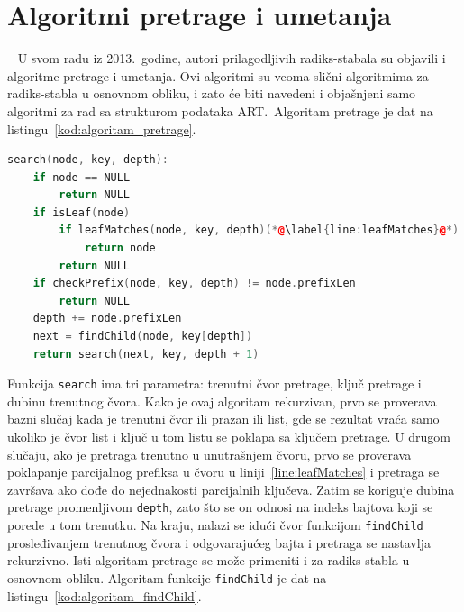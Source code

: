 \documentclass[12pt,oneside]{memoir}
\begin{document}
\section{Algoritmi pretrage i umetanja}~\label{sec:algoritmi_pretraga_umetanje}
U svom radu iz 2013.\ godine, autori prilagodljivih radiks-stabala su
objavili i algoritme pretrage i umetanja. Ovi algoritmi su veoma slični
algoritmima za radiks-stabla u osnovnom obliku, i zato će biti navedeni
i objašnjeni samo algoritmi za rad sa strukturom podataka ART.\
Algoritam pretrage je dat na listingu~\ref{kod:algoritam_pretrage}.

\begin{lstlisting}[language=C++,
                   caption={Algoritam pretrage strukture podataka ART},
                   label={kod:algoritam_pretrage}]
search(node, key, depth):
    if node == NULL
        return NULL
    if isLeaf(node)
        if leafMatches(node, key, depth)(*@\label{line:leafMatches}@*)
            return node
        return NULL
    if checkPrefix(node, key, depth) != node.prefixLen
        return NULL
    depth += node.prefixLen
    next = findChild(node, key[depth])
    return search(next, key, depth + 1)
\end{lstlisting}

Funkcija \texttt{search} ima tri parametra: trenutni čvor pretrage, ključ
pretrage i dubinu trenutnog čvora. Kako je ovaj algoritam rekurzivan,
prvo se proverava bazni slučaj kada je trenutni čvor ili prazan ili
list, gde se rezultat vraća samo ukoliko je čvor list i ključ u tom listu
se poklapa sa ključem pretrage. U drugom slučaju, ako je pretraga trenutno
u unutrašnjem čvoru, prvo se proverava poklapanje parcijalnog prefiksa
u čvoru u liniji~\ref{line:leafMatches} i pretraga se završava ako dođe
do nejednakosti parcijalnih ključeva. Zatim se koriguje dubina pretrage
promenljivom \texttt{depth},
zato što se on odnosi na indeks bajtova koji se
porede u tom trenutku.
Na kraju, nalazi se idući čvor funkcijom \texttt{findChild} prosleđivanjem
trenutnog čvora i odgovarajućeg bajta i pretraga se
nastavlja rekurzivno. Isti algoritam pretrage se može primeniti i za
radiks-stabla u osnovnom obliku. Algoritam funkcije
\texttt{findChild} je dat na listingu~\ref{kod:algoritam_findChild}.
\end{document}
